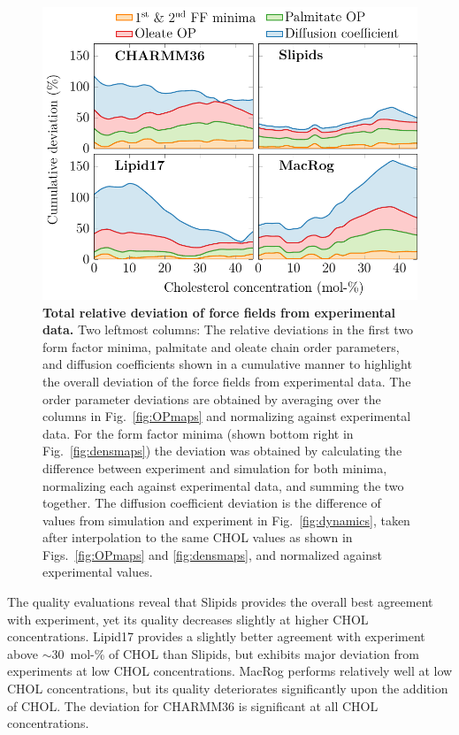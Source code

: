 \documentclass[journal=jctcce]{achemso}
\begin{document}
\begin{figure}[htb!]
  \centering
  \includegraphics[width=0.8\linewidth]{../FIGS/deviation.pdf}
  \caption{\label{fig:deviation}%
  \textbf{Total relative deviation of force fields from experimental data.} 
%
  Two leftmost columns:
  The relative deviations in the first two form factor minima, palmitate and oleate chain order parameters, and diffusion coefficients shown in a cumulative manner to highlight the overall deviation of the force fields from experimental data.
  The order parameter deviations are obtained by averaging over the columns in Fig.~\ref{fig:OPmaps} and normalizing against experimental data. For the form factor minima (shown bottom right in Fig.~\ref{fig:densmaps}) the deviation was obtained by calculating the difference between experiment and simulation for both minima, normalizing each against experimental data, and summing the two together. The diffusion coefficient deviation is the difference of values from simulation and experiment in Fig.~\ref{fig:dynamics}, taken after interpolation to the same CHOL values as shown in Figs.~\ref{fig:OPmaps} and \ref{fig:densmaps}, and normalized against experimental values.
%
  }
\end{figure}

The quality evaluations reveal that Slipids provides the overall best agreement with experiment, yet its quality decreases slightly at higher CHOL concentrations. Lipid17 provides a slightly better agreement with experiment above $\sim$30~mol-\% of CHOL than Slipids, but exhibits major deviation from experiments at low CHOL concentrations. MacRog performs relatively well at low CHOL concentrations, but its quality deteriorates significantly upon the addition of CHOL. The deviation for CHARMM36 is significant at all CHOL concentrations. 
\end{document}
